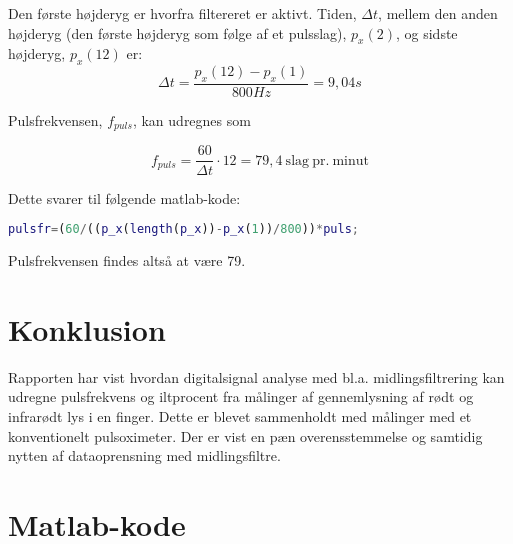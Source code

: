 \documentclass{article}
\begin{document}
Den første højderyg er hvorfra filtereret er aktivt. Tiden, $\Delta t$, mellem den anden højderyg (den første højderyg som følge af et pulsslag), $p_x(2)$, og sidste højderyg, $p_x(12)$ er:
\begin{equation}
  \label{eq:5}
  \Delta t=\frac{p_x(12)-p_x(1)}{800Hz}=9,04s
\end{equation}

Pulsfrekvensen, $f_{puls}$, kan udregnes som

\begin{equation}
  \label{eq:6}
  f_{puls}=\frac{60}{\Delta t}\cdot 12=79,4\mathrm{\ slag\ pr.\ minut}
\end{equation}

Dette svarer til følgende matlab-kode:
\begin{lstlisting}[language=Matlab,basicstyle=\tiny]
  pulsfr=(60/((p_x(length(p_x))-p_x(1))/800))*puls;
\end{lstlisting}

Pulsfrekvensen findes altså at være 79.

\section{Konklusion}
\label{sec:konklusion}

Rapporten har vist hvordan digitalsignal analyse med bl.a. midlingsfiltrering kan udregne pulsfrekvens og iltprocent fra målinger af gennemlysning af rødt og infrarødt lys i en finger. Dette er blevet sammenholdt med målinger med et konventionelt pulsoximeter.
Der er vist en pæn overensstemmelse og samtidig nytten af dataoprensning med midlingsfiltre.
\clearpage
\appendix

\section{Matlab-kode}
\label{sec:appendix-vhdl-koden}

\end{document}
